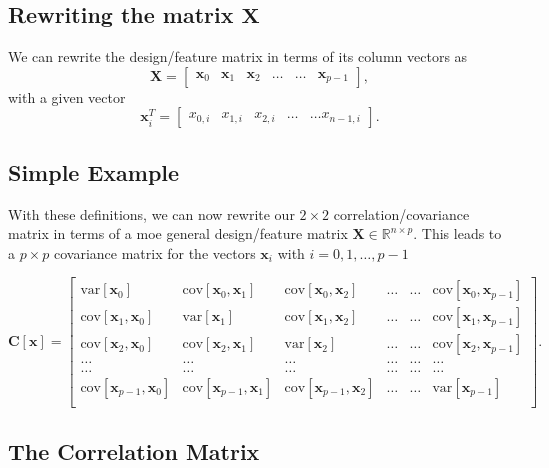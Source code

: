 \documentclass[%
oneside,                 %
final,                   %
10pt]{article}
\begin{document}
\subsection{Rewriting the matrix $\bm{X}$}

We can rewrite the design/feature matrix in terms of its column vectors as
\[
\bm{X}=\begin{bmatrix} \bm{x}_0 & \bm{x}_1 & \bm{x}_2 & \dots & \dots & \bm{x}_{p-1}\end{bmatrix},
\]
with a given vector
\[
\bm{x}_i^T = \begin{bmatrix}x_{0,i} & x_{1,i} & x_{2,i}& \dots & \dots x_{n-1,i}\end{bmatrix}.
\]

\subsection{Simple Example}

With these definitions, we can now rewrite our $2\times 2$
correlation/covariance matrix in terms of a moe general design/feature
matrix $\bm{X}\in {\mathbb{R}}^{n\times p}$. This leads to a $p\times p$
covariance matrix for the vectors $\bm{x}_i$ with $i=0,1,\dots,p-1$

\[
\bm{C}[\bm{x}] = \begin{bmatrix}
\mathrm{var}[\bm{x}_0] & \mathrm{cov}[\bm{x}_0,\bm{x}_1]  & \mathrm{cov}[\bm{x}_0,\bm{x}_2] & \dots & \dots & \mathrm{cov}[\bm{x}_0,\bm{x}_{p-1}]\\
\mathrm{cov}[\bm{x}_1,\bm{x}_0] & \mathrm{var}[\bm{x}_1]  & \mathrm{cov}[\bm{x}_1,\bm{x}_2] & \dots & \dots & \mathrm{cov}[\bm{x}_1,\bm{x}_{p-1}]\\
\mathrm{cov}[\bm{x}_2,\bm{x}_0]   & \mathrm{cov}[\bm{x}_2,\bm{x}_1] & \mathrm{var}[\bm{x}_2] & \dots & \dots & \mathrm{cov}[\bm{x}_2,\bm{x}_{p-1}]\\
\dots & \dots & \dots & \dots & \dots & \dots \\
\dots & \dots & \dots & \dots & \dots & \dots \\
\mathrm{cov}[\bm{x}_{p-1},\bm{x}_0]   & \mathrm{cov}[\bm{x}_{p-1},\bm{x}_1] & \mathrm{cov}[\bm{x}_{p-1},\bm{x}_{2}]  & \dots & \dots  & \mathrm{var}[\bm{x}_{p-1}]\\
\end{bmatrix}.
\]

\subsection{The Correlation Matrix}
\end{document}
